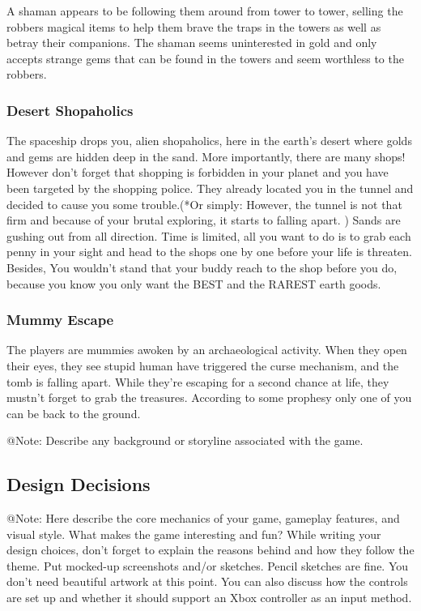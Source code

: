 A shaman appears to be following them around from tower to tower, selling the robbers magical items to help them brave the traps in the towers as well as betray their companions. The shaman seems uninterested in gold and only accepts strange gems that can be found in the towers and seem worthless to the robbers.

\subsubsection{Desert Shopaholics}

The spaceship drops you, alien shopaholics, here in the earth's desert where golds and gems are hidden deep in the sand. More importantly, there are many shops! However don't forget that shopping is forbidden in your planet and you have been targeted by the shopping police. They already located you in the tunnel and decided to cause you some trouble.(*Or simply: However, the tunnel is not that firm and because of your brutal exploring, it starts to falling apart. ) Sands are gushing out from all direction. Time is limited, all you want to do is to grab each penny in your sight and head to the shops one by one before your life is threaten. Besides, You wouldn't stand that your buddy reach to the shop before you do, because you know you only want the BEST and the RAREST earth goods.


\subsubsection{Mummy Escape}

The players are mummies awoken by an archaeological activity. When they open their eyes, they see stupid human have triggered the curse mechanism, and the tomb is falling apart. While they're escaping for a second chance at life, they mustn't forget to grab the treasures. According to some prophesy only one of you can be back to the ground.


\begin{TempText}
    
    
    
	@Note: Describe any background or storyline associated with the game.
\end{TempText}

\subsection{Design Decisions}

\begin{TempText}
	@Note: Here describe the core mechanics of your game, gameplay features, and visual style. What makes the game interesting and fun? While writing your design choices, don't forget to explain the reasons behind and how they follow the theme. Put mocked-up screenshots and/or sketches. Pencil sketches are fine. You don't need beautiful artwork at this point. You can also discuss how the controls are set up and whether it should support an Xbox controller as an input method.
\end{TempText}

